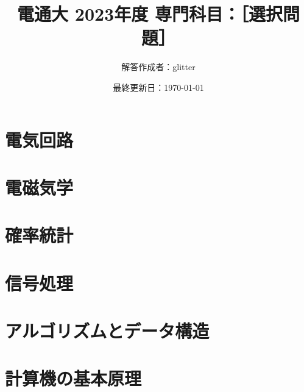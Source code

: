 \documentclass{jsarticle}
\theoremstyle{definition}
\begin{document}
\title{電通大 2023年度 専門科目：［選択問題］}
\author{解答作成者：glitter}
\date{最終更新日：\today}
\maketitle
  \begin{abstract}
  \end{abstract}
  \section{電気回路}

  \section{電磁気学}

  \section{確率統計}

  \section{信号処理}

  \section{アルゴリズムとデータ構造}

  \section{計算機の基本原理}

  \newpage
\end{document}
